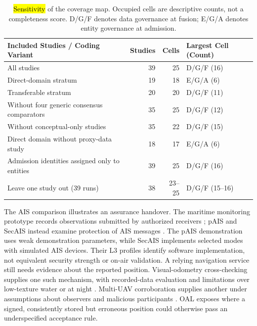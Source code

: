 \documentclass[blockchains,review,accept,moreauthors]{Definitions/mdpi}
\begin{document}
\begin{table}[H]
\caption{\hl{Sensitivity} %
 of the coverage map. Occupied cells are descriptive counts, not a completeness score. D/G/F denotes data governance at fusion; E/G/A denotes entity governance at admission.\label{tab:sensitivity}}
\begin{tabularx}{\textwidth}{@{}YrrP{33mm}@{}}
\toprule
\textbf{Included Studies / Coding Variant} & \textbf{Studies} & \textbf{Cells} & \textbf{Largest Cell (Count)}\\
\midrule
All studies & 39 & 25 & D/G/F (16)\\
Direct-domain stratum & 19 & 18 & E/G/A (6)\\
Transferable stratum & 20 & 20 & D/G/F (11)\\
Without four generic consensus comparators & 35 & 25 & D/G/F (12)\\
Without conceptual-only studies & 35 & 22 & D/G/F (15)\\
Direct domain without proxy-data study & 18 & 17 & E/G/A (6)\\
Admission identities assigned only to entities & 39 & 25 & D/G/F (16)\\
Leave one study out (39 runs) & 38 & 23--25 & D/G/F (15--16)\\
\bottomrule
\end{tabularx}
\end{table}

The AIS comparison illustrates an assurance handover. The maritime monitoring prototype records observations submitted by authorized receivers \citep{maritime2022monitoring}; pAIS and SecAIS instead examine protection of AIS messages \citep{kessler2020protected,goudossis2022secais}. The pAIS demonstration uses weak demonstration parameters, while SecAIS implements selected modes with simulated AIS devices. Their L3 profiles identify software implementation, not equivalent security strength or on-air validation. A relying navigation service still needs evidence about the reported position. Visual-odometry cross-checking supplies one such mechanism, with recorded-data evaluation and limitations over low-texture water or at night \citep{varshosaz2019spoofing}. Multi-UAV corroboration supplies another under assumptions about observers and malicious participants \citep{garcamagario2019security,barka2022towards}. OAL exposes where a signed, consistently stored but erroneous position could otherwise pass an underspecified acceptance rule.
\end{document}
